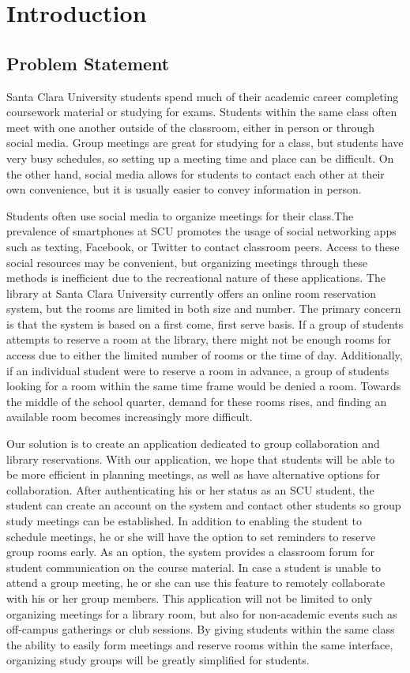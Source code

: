 \chapter{Introduction}
\section{Problem Statement}

Santa Clara University students spend much of their academic career completing coursework material or studying for exams. Students within the same class often meet with one another outside of the classroom, either in person or through social media. Group meetings are great for studying for a class, but students have very busy schedules, so setting up a meeting time and place can be difficult. On the other hand, social media allows for students to contact each other at their own convenience, but it is usually easier to convey information in person. 

Students often use social media to organize meetings for their class.The prevalence of smartphones at SCU promotes the usage of social networking apps such as texting, Facebook, or Twitter to contact classroom peers. Access to these social resources may be convenient, but organizing meetings through these methods is inefficient due to the recreational nature of these applications. The library at Santa Clara University currently offers an online room reservation system, but the rooms are limited in both size and number. The primary concern is that the system is based on a first come, first serve basis. If a group of students attempts to reserve a room at the library, there might not be enough rooms for access due to either the limited number of rooms or the time of day. Additionally, if an individual student were to reserve a room in advance, a group of students looking for a room within the same time frame would be denied a room. Towards the middle of the school quarter, demand for these rooms rises, and finding an available room becomes increasingly more difficult. 

Our solution is to create an application dedicated to group collaboration and library reservations.  With our application, we hope that students will be able to be more efficient in planning meetings, as well as have alternative options for collaboration. After authenticating his or her status as an SCU student, the student can create an account on the system and contact other students so group study meetings can be established. In addition to enabling the student to schedule meetings, he or she will have the option to set reminders to reserve group rooms early. As an option, the system provides a classroom forum for student communication on the course material. In case a student is unable to attend a group meeting, he or she can use this feature to remotely collaborate with his or her group members. This application will not be limited to only organizing meetings for a library room, but also for non-academic events such as off-campus gatherings or club sessions. By giving students within the same class the ability to easily form meetings and reserve rooms within the same interface,  organizing study groups will be greatly simplified for students.

